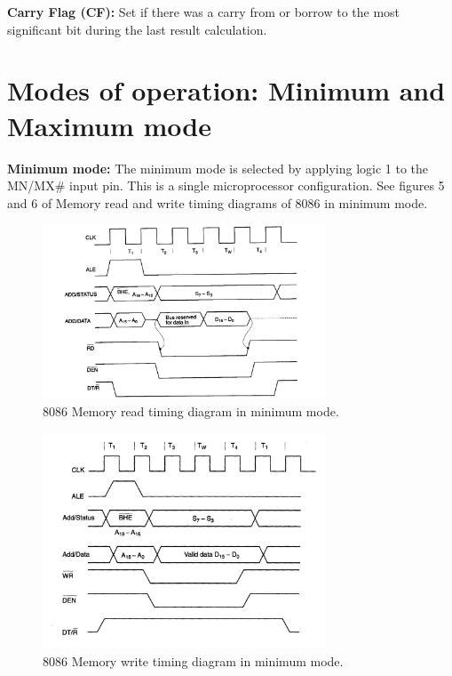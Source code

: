 \documentclass[12pt, a4paper]{scrartcl}
\begin{document}
	\textbf{Carry Flag (CF): }Set if there was a carry from or borrow to the most significant bit during the last result calculation.\\
	
\section{Modes of operation: Minimum and Maximum mode}

	\textbf{Minimum mode: }The minimum mode is selected by applying logic 1 to the MN/MX\# input pin. This is a single microprocessor configuration. See figures 5 and 6 of Memory read and write timing diagrams of 8086 in minimum mode.\\
	
	\begin{figure}[h]
		\centering
		\includegraphics[width=0.75\textwidth]{images/8086-min-read.png}
		\caption{8086 Memory read timing diagram in minimum mode.}
		\label{image-5}
	\end{figure}

	\begin{figure}[h]
		\centering
		\includegraphics[width=0.75\textwidth]{images/8086-min-write.png}
		\caption{8086 Memory write timing diagram in minimum mode.}
		\label{image-6}
	\end{figure}
	
\end{document}
